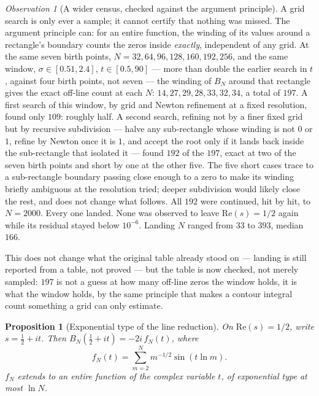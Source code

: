 \documentclass[10pt,a4paper]{article}
\theoremstyle{plain}
\newtheorem{proposition}{Proposition}
\theoremstyle{definition}
\theoremstyle{remark}
\newtheorem{observation}{Observation}
\begin{document}
\begin{observation}[A wider census, checked against the argument principle]
\label{obs:widecensus}
A grid search is only ever a sample; it cannot certify that nothing was missed.
The argument principle can: for an entire function, the winding of its values around a rectangle's boundary counts the zeros inside \emph{exactly}, independent of any grid.
At the same seven birth points, \(N=32,64,96,128,160,192,256\), and the same window, \(\sigma\in[0.51,2.4]\), \(t\in[0.5,90]\) --- more than double the earlier search in \(t\), against four birth points, not seven --- the winding of \(B_N\) around that rectangle gives the exact off-line count at each \(N\): \(14,27,29,28,33,32,34\), a total of \(197\).
A first search of this window, by grid and Newton refinement at a fixed resolution, found only \(109\): roughly half.
A second search, refining not by a finer fixed grid but by recursive subdivision --- halve any sub-rectangle whose winding is not \(0\) or \(1\), refine by Newton once it is \(1\), and accept the root only if it lands back inside the sub-rectangle that isolated it --- found \(192\) of the \(197\), exact at two of the seven birth points and short by one at the other five.
The five short cases trace to a sub-rectangle boundary passing close enough to a zero to make its winding briefly ambiguous at the resolution tried; deeper subdivision would likely close the rest, and does not change what follows.
All \(192\) were continued, hit by hit, to \(N=2000\).
Every one landed.
None was observed to leave \(\mathrm{Re}(s)=1/2\) again while its residual stayed below \(10^{-6}\).
Landing \(N\) ranged from \(33\) to \(393\), median \(166\).
\end{observation}

This does not change what the original table already stood on --- landing is still reported from a table, not proved --- but the table is now checked, not merely sampled: \(197\) is not a guess at how many off-line zeros the window holds, it is what the window holds, by the same principle that makes a contour integral count something a grid can only estimate.

\begin{proposition}[Exponential type of the line reduction]
\label{prop:linetype}
On \(\mathrm{Re}(s)=1/2\), write \(s=\tfrac12+it\).
Then \(B_N(\tfrac12+it)=-2i\,f_N(t)\), where
\[
f_N(t)=\sum_{m=2}^N m^{-1/2}\sin(t\ln m).
\]
\(f_N\) extends to an entire function of the complex variable \(t\), of exponential type at most \(\ln N\).
\end{proposition}
\end{document}
